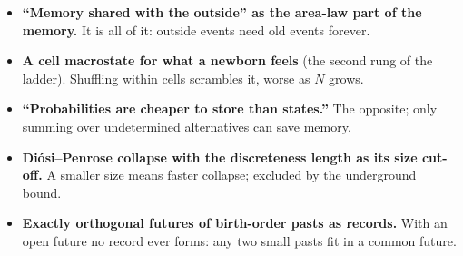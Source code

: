 \documentclass[11pt,a4paper]{article}
\begin{document}
\begin{itemize}[leftmargin=*,itemsep=1pt]
\item \textbf{``Memory shared with the outside'' as the area-law part of the memory.} It is all of it: outside events need old events forever.
\item \textbf{A cell macrostate for what a newborn feels} (the second rung of the ladder). Shuffling within cells scrambles it, worse as $N$ grows.
\item \textbf{``Probabilities are cheaper to store than states.''} The opposite; only summing over undetermined alternatives can save memory.
\item \textbf{Di\'osi--Penrose collapse with the discreteness length as its size cut-off.} A smaller size means faster collapse; excluded by the underground bound.
\item \textbf{Exactly orthogonal futures of birth-order pasts as records.} With an open future no record ever forms: any two small pasts fit in a common future.
\end{itemize}
\end{document}
